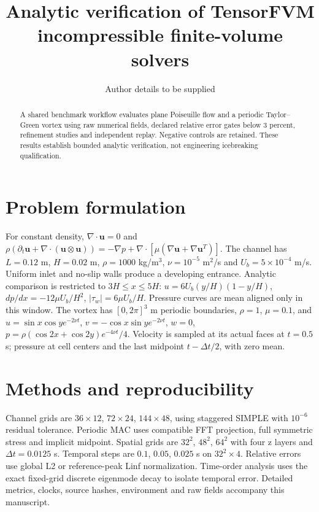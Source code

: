 \documentclass[11pt]{article}
\title{Analytic verification of TensorFVM incompressible finite-volume solvers}
\author{Author details to be supplied}
\date{}
\begin{document}
\maketitle
\begin{abstract}
A shared benchmark workflow evaluates plane Poiseuille flow and a periodic Taylor--Green vortex using raw numerical fields, declared relative error gates below 3 percent, refinement studies and independent replay. Negative controls are retained. These results establish bounded analytic verification, not engineering icebreaking qualification.
\end{abstract}
\section{Problem formulation}
For constant density, $\nabla\cdot\mathbf u=0$ and
$\rho(\partial_t\mathbf u+\nabla\cdot(\mathbf u\otimes\mathbf u))=-\nabla p+\nabla\cdot[\mu(\nabla\mathbf u+\nabla\mathbf u^T)]$.
The channel has $L=0.12$ m, $H=0.02$ m, $\rho=1000$ kg/m$^3$, $\nu=10^{-5}$ m$^2$/s and $U_b=5\times10^{-4}$ m/s. Uniform inlet and no-slip walls produce a developing entrance. Analytic comparison is restricted to $3H\leq x\leq5H$:
$u=6U_b(y/H)(1-y/H)$, $dp/dx=-12\mu U_b/H^2$, $|\tau_w|=6\mu U_b/H$.
Pressure curves are mean aligned only in this window.
The vortex has $[0,2\pi]^3$ m periodic boundaries, $\rho=1$, $\mu=0.1$, and
$u=\sin x\cos y e^{-2\nu t}$, $v=-\cos x\sin y e^{-2\nu t}$, $w=0$,
$p=\rho(\cos2x+\cos2y)e^{-4\nu t}/4$.
Velocity is sampled at its actual faces at $t=0.5$ s; pressure at cell centers and the last midpoint $t-\Delta t/2$, with zero mean.
\section{Methods and reproducibility}
Channel grids are $36\times12$, $72\times24$, $144\times48$, using staggered SIMPLE with $10^{-6}$ residual tolerance.
Periodic MAC uses compatible FFT projection, full symmetric stress and implicit midpoint. Spatial grids are $32^2$, $48^2$, $64^2$ with four z layers and $\Delta t=0.0125$ s. Temporal steps are $0.1$, $0.05$, $0.025$ s on $32^2\times4$.
Relative errors use global L2 or reference-peak Linf normalization. Time-order analysis uses the exact fixed-grid discrete eigenmode decay to isolate temporal error. Detailed metrics, clocks, source hashes, environment and raw fields accompany this manuscript.
\end{document}
